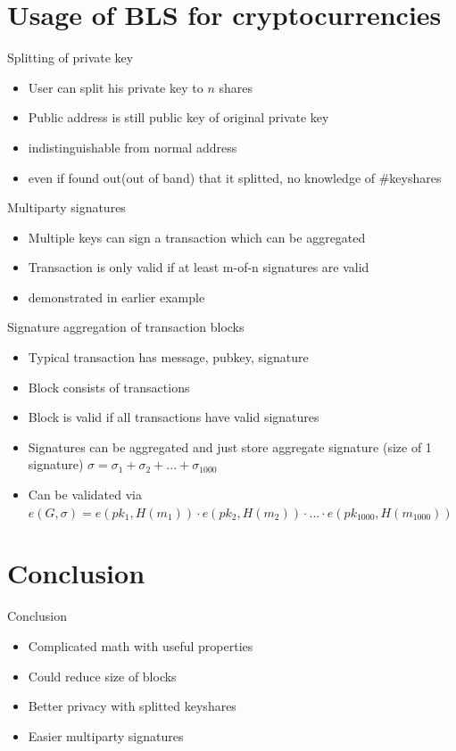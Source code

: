 \documentclass{beamer}
\begin{document}
\section{Usage of BLS for cryptocurrencies}
\begin{frame}{Splitting of private key}
	\begin{itemize}
		\item User can split his private key to $n$ shares
		\item Public address is still public key of original private key
		\item indistinguishable from normal address
		\item even if found out(out of band) that it splitted, no knowledge of \#keyshares
	\end{itemize}
\end{frame}
\begin{frame}{Multiparty signatures}
	\begin{itemize}
		\item Multiple keys can sign a transaction which can be aggregated
		\item Transaction is only valid if at least m-of-n signatures are valid
		\item demonstrated in earlier example
	\end{itemize}
\end{frame}
\begin{frame}{Signature aggregation of transaction blocks}
	\begin{itemize}
		\item Typical transaction has message, pubkey, signature
		\item Block consists of transactions
		\item Block is valid if all transactions have valid signatures
		\item Signatures can be aggregated and just store aggregate signature (size of 1 signature) \newline
		 $\sigma = \sigma_1 + \sigma_2 + ... + \sigma_{1000}$
		 \item Can be validated via \newline
		 $e(G,\sigma) = e(pk_1,H(m_1)) \cdot e(pk_2,H(m_2)) \cdot ... \cdot e(pk_{1000},H(m_{1000}))$
	\end{itemize}
\end{frame}
\section{Conclusion}
\begin{frame}{Conclusion}
	\begin{itemize}
		\item Complicated math with useful properties
		\item Could reduce size of blocks
		\item Better privacy with splitted keyshares
		\item Easier multiparty signatures
	\end{itemize}
\end{frame}
\end{document}
